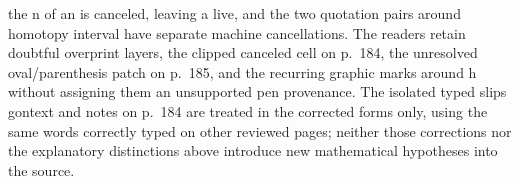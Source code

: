 the n of an is canceled, leaving a live, and the two quotation pairs around homotopy interval have separate machine cancellations. The readers retain doubtful overprint layers, the clipped canceled cell on p.~184, the unresolved oval/parenthesis patch on p.~185, and the recurring graphic marks around h without assigning them an unsupported pen provenance. The isolated typed slips gontext and notes on p.~184 are treated in the corrected forms only, using the same words correctly typed on other reviewed pages; neither those corrections nor the explanatory distinctions above introduce new mathematical hypotheses into the source.
